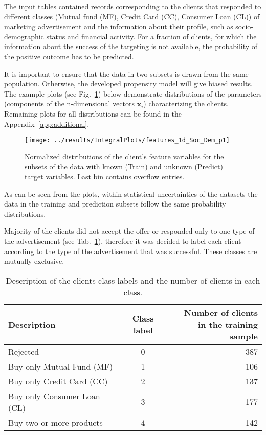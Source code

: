 \documentclass[14pt]{scrartcl}
\begin{document}
The input tables contained records corresponding to the clients that responded to 
different classes (Mutual fund (MF), Credit Card (CC), Consumer Loan (CL)) of 
marketing advertisement and the information about their profile, such as 
socio-demographic status and financial activity. For a fraction of clients, 
for which the information about the success of the targeting is not available, the
probability of the positive outcome has to be predicted. 

It is important to ensure
that the data in two subsets is drawn from the same population. Otherwise, the
developed propensity model will give biased results.
The example plots (see Fig.~\ref{fig:inclus_features_1d_Soc_Dem_p1}) below demonstrate 
distributions of the parameters 
(components of the n-dimensional vectors $\textbf{x}_i$) characterizing the clients.
Remaining plots for all distributions can be found in the Appendix~\ref{app:additional}.
\begin{figure}[h!]
    \texttt{[image: ../results/IntegralPlots/features\_1d\_Soc\_Dem\_p1]}\\
    \caption{Normalized distributions of the client's feature variables for the
    subsets of the
    data with known (Train) and unknown (Predict) target variables. Last bin contains
    overflow entries.}
    \label{fig:inclus_features_1d_Soc_Dem_p1}
\end{figure}
As can be seen from the plots, within statistical uncertainties of the datasets
the data in the training and prediction subsets follow the same probability
distributions.

Majority of the clients did not accept the offer or responded only to one type of 
the advertisement (see Tab.~\ref{tab:clients_per_class}), therefore it was decided to 
label each client according to the type of the advertisement that was successful.
These classes are mutually exclusive.

\begin{table}[htpb!]
    \centering
    \begin{tabular}{ l c | r }
        Description & Class label & \thead{Number of clients \\ in the training sample} \\
        \hline
        Rejected & 0 & 387 \\
        Buy only Mutual Fund (MF) & 1 & 106 \\
        Buy only Credit Card (CC) & 2 & 137 \\
        Buy only Consumer Loan (CL) & 3 & 177 \\
        Buy two or more products & 4 & 142\\
    \end{tabular}
    \caption{Description of the clients class labels and the number of clients in 
    each class.}\label{tab:clients_per_class}
\end{table}
\end{document}
